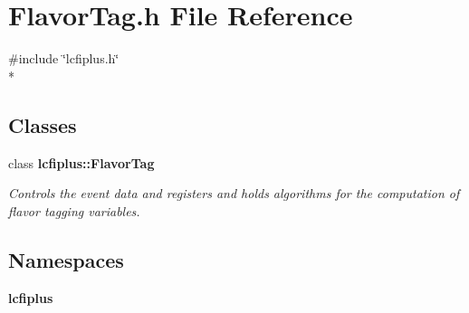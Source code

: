 \section{Flavor\-Tag.\-h File Reference}
\label{FlavorTag_8h}
{\ttfamily \#include \char`\"{}lcfiplus.\-h\char`\"{}}\\*
\subsection*{Classes}
\begin{DoxyCompactItemize}
\item 
class {\bf lcfiplus\-::\-Flavor\-Tag}
\begin{DoxyCompactList}\small\item\em Controls the event data and registers and holds algorithms for the computation of flavor tagging variables. \end{DoxyCompactList}\end{DoxyCompactItemize}
\subsection*{Namespaces}
\begin{DoxyCompactItemize}
\item 
{\bf lcfiplus}
\end{DoxyCompactItemize}

